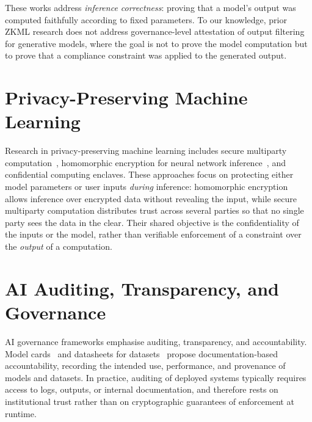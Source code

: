 \medskip

These works address \emph{inference correctness}: proving that a model's output was computed faithfully according to fixed parameters. To our knowledge, prior ZKML research does not address governance-level attestation of output filtering for generative models, where the goal is not to prove the model computation but to prove that a compliance constraint was applied to the generated output.

\section{Privacy-Preserving Machine Learning}
\label{sec:rw-ppml}

\begin{sloppypar}
Research in privacy-preserving machine learning includes secure multiparty computation~\cite{lindell2009smpc}, homomorphic encryption for neural network inference~\cite{gilad2016cryptonets,brutzkus2019lowlatency}, and confidential computing enclaves. These approaches focus on protecting either model parameters or user inputs \emph{during} inference: homomorphic encryption allows inference over encrypted data without revealing the input, while secure multiparty computation distributes trust across several parties so that no single party sees the data in the clear. Their shared objective is the confidentiality of the inputs or the model, rather than verifiable enforcement of a constraint over the \emph{output} of a computation.
\end{sloppypar}

\section{AI Auditing, Transparency, and Governance}
\label{sec:rw-governance}

\begin{sloppypar}
AI governance frameworks emphasise auditing, transparency, and accountability. Model cards~\cite{mitchell2019modelcards} and datasheets for datasets~\cite{gebru2018datasheets} propose documentation-based accountability, recording the intended use, performance, and provenance of models and datasets. In practice, auditing of deployed systems typically requires access to logs, outputs, or internal documentation, and therefore rests on institutional trust rather than on cryptographic guarantees of enforcement at runtime.
\end{sloppypar}

